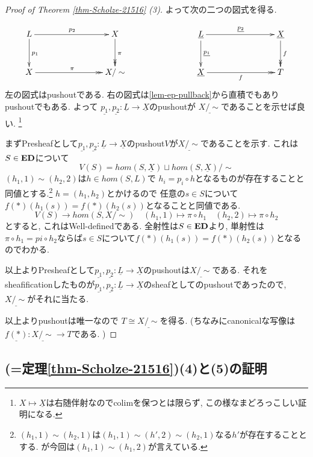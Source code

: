 \documentclass[dvipdfmx,a4paper,11pt]{report}
\theoremstyle{definition}
\begin{document}
\begin{proof}[Proof of Theorem \ref{thm-Scholze-21516} (3)]
よって次の二つの図式を得る.

\begin{equation*}
\xymatrix@C=80pt@R=30pt{
L\ar@{->}[r]^{p_2}\ar@{->}[d]^{p_1}
&X \ar@{->>}[d]^{\pi}
&
\underline{L}\ar@{->}[r]^{\underline{p_2}}
\ar@{->}[d]^{\underline{p_1}}
& \underline{X}\ar@{->>}[d]^{f}
\\
X \ar@{->>}[r]^{\pi}
&X/\sim
&
 \underline{X} \ar@{->>}[r]_{f}
& T
 \\   
}
\end{equation*}
左の図式はpushoutである. 
右の図式は\ref{lem-ep-pullback}から直積でもありpushoutでもある. 
よって
$\underline{p_1}, \underline{p_2} : \underline{L} \to \underline{X}$のpushoutが
$\underline{X/\sim}$であることを示せば良い. \footnote{$X \mapsto \underline{X}$は右随伴射なのでcolimを保つとは限らず, この様なまどろっこしい証明になる.}

まずPresheafとして$\underline{p_1}, \underline{p_2} : \underline{L} \to \underline{X}$のpushout$V$が$\underline{X/\sim}$であることを示す. 
これは$S \in {\bf ED}$について
$$
V(S) =hom(S, \underline{X})\sqcup hom(S, \underline{X})/\sim
$$
$(h_1,1) \sim (h_2,2) $は$h \in hom(S,L)$で
$h_i = p_i \circ h $となるものが存在することと同値とする.\footnote{$(h_1,1) \sim (h_2,1)$は$(h_1,1) \sim (h',2) \sim (h_2,1)$なる$h'$が存在することとする. が今回は$(h_1,1)\sim (h_1,2)$が言えている. }
$h = (h_1, h_2)$とかけるので
任意の$s \in S$について$f(\ast)(h_1(s)) = f(\ast)(h_2(s))$となることと同値である. 
$$
V(S) \to hom(S,X/\sim)
\quad
(h_1,1) \mapsto \pi \circ h_1
\quad
(h_2,2) \mapsto \pi \circ h_2
$$
とすると, これはWell-definedである. 
全射性は$S \in {\bf ED}$より, 単射性は
$\pi \circ h_1 = pi \circ h_2$ならば$s \in S$について$f(\ast)(h_1(s)) = f(\ast)(h_2(s))$となるのでわかる. 

以上よりPresheafとして$\underline{p_1}, \underline{p_2} : \underline{L} \to \underline{X}$のpushoutは$\underline{X/\sim}$である.
それをsheafificationしたものが$\underline{p_1}, \underline{p_2} : \underline{L} \to \underline{X}$のsheafとしてのpushoutであったので, $\underline{X/\sim}$がそれに当たる.

以上よりpushoutは唯一なので
$T \cong \underline{X/\sim}$を得る. 
(ちなみにcanonicalな写像は$\underline{f(\ast)} : \underline{X/\sim} \to T$である. )

\end{proof}



\subsection{\cite[Proposition 2.15, Theorem 2.16]{Sch19}(=定理\ref{thm-Scholze-21516})(4)と(5)の証明}
\end{document}
